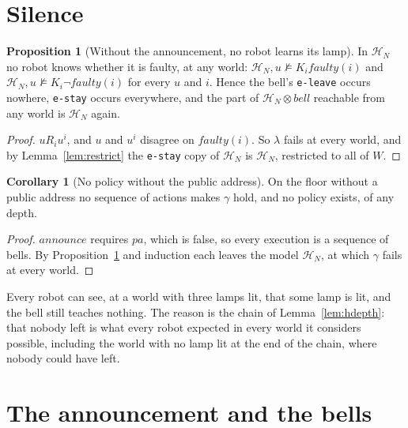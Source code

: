 \documentclass[11pt,a4paper]{article}
\theoremstyle{definition}
\newtheorem{proposition}{Proposition}
\newtheorem{corollary}{Corollary}
\newcommand{\prd}{\otimes}
\newcommand{\Kop}[1]{K_{#1}}
\newcommand{\code}[1]{\texttt{\small #1}}
\newcommand{\faulty}{\mathit{faulty}}
\newcommand{\Hc}{\mathcal{H}}
\begin{document}
\section{Silence}
\label{sec:silent}

\begin{proposition}[Without the announcement, no robot learns its lamp]
\label{prop:silent}
In $\Hc_N$ no robot knows whether it is faulty, at any world:
$\Hc_N, u \not\models \Kop{i}\faulty(i)$ and
$\Hc_N, u \not\models \Kop{i}\neg\faulty(i)$ for every $u$ and $i$. Hence the
bell's \code{e-leave} occurs nowhere, \code{e-stay} occurs everywhere, and the
part of $\Hc_N \prd \mathit{bell}$ reachable from any world is $\Hc_N$ again.
\end{proposition}

\begin{proof}
$u R_i u^i$, and $u$ and $u^i$ disagree on $\faulty(i)$. So $\lambda$ fails at
every world, and by Lemma~\ref{lem:restrict} the \code{e-stay} copy of $\Hc_N$
is $\Hc_N$, restricted to all of $W$.
\end{proof}

\begin{corollary}[No policy without the public address]
\label{cor:silent}
On the floor without a public address no sequence of actions makes $\gamma$
hold, and no policy exists, of any depth.
\end{corollary}

\begin{proof}
$\mathit{announce}$ requires $\mathit{pa}$, which is false, so every execution
is a sequence of bells. By Proposition~\ref{prop:silent} and induction each
leaves the model $\Hc_N$, at which $\gamma$ fails at every world.
\end{proof}

\noindent
Every robot can see, at a world with three lamps lit, that some lamp is lit,
and the bell still teaches nothing. The reason is the chain of
Lemma~\ref{lem:hdepth}: that nobody left is what every robot expected in every
world it considers possible, including the world with no lamp lit at the end of
the chain, where nobody could have left.

\section{The announcement and the bells}
\label{sec:bells}
\end{document}
